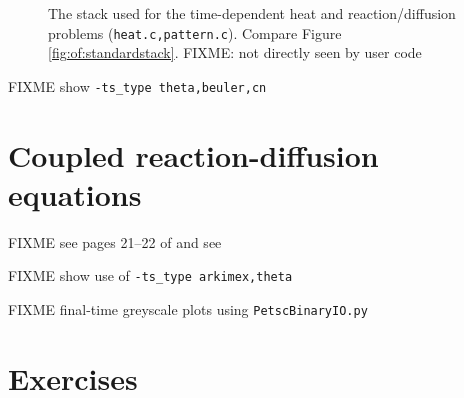 
\begin{figure}
\caption{The \PETSc stack used for the time-dependent heat and reaction/diffusion problems (\texttt{heat.c,pattern.c}).  Compare Figure \ref{fig:of:standardstack}.  FIXME: \pSNES not directly seen by user code}
\label{fig:of:tsstack}
\end{figure}

FIXME show \texttt{-ts\_type theta,beuler,cn}


\section{Coupled reaction-diffusion equations}

FIXME see pages 21--22 of \citep{HundsdorferVerwer2003} and see \citep{Pearson1993}






FIXME show use of \texttt{-ts\_type arkimex,theta}

FIXME final-time greyscale plots using \texttt{PetscBinaryIO.py}


\section{Exercises}

